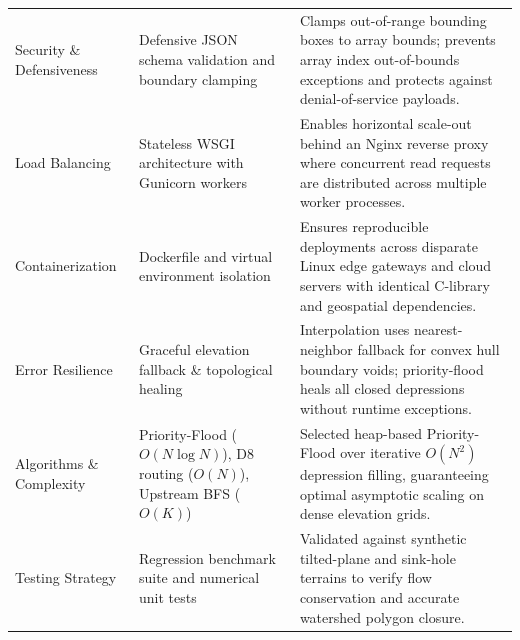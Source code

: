 \documentclass[manuscript,screen,review]{acmart}
\begin{document}
\begin{table}[htb]
\begin{tabular}{p{2.3cm}p{3.8cm}p{7.1cm}}
    Security \& Defensiveness & Defensive JSON schema validation and boundary clamping & Clamps out-of-range bounding boxes to array bounds; prevents array index out-of-bounds exceptions and protects against denial-of-service payloads. \\
    Load Balancing & Stateless WSGI architecture with Gunicorn workers & Enables horizontal scale-out behind an Nginx reverse proxy where concurrent read requests are distributed across multiple worker processes. \\
    Containerization & Dockerfile and virtual environment isolation & Ensures reproducible deployments across disparate Linux edge gateways and cloud servers with identical C-library and geospatial dependencies. \\
    Error Resilience & Graceful elevation fallback \& topological healing & Interpolation uses nearest-neighbor fallback for convex hull boundary voids; priority-flood heals all closed depressions without runtime exceptions. \\
    Algorithms \& Complexity & Priority-Flood ($O(N \log N)$), D8 routing ($O(N)$), Upstream BFS ($O(K)$) & Selected heap-based Priority-Flood over iterative $O(N^2)$ depression filling, guaranteeing optimal asymptotic scaling on dense elevation grids. \\
    Testing Strategy & Regression benchmark suite and numerical unit tests & Validated against synthetic tilted-plane and sink-hole terrains to verify flow conservation and accurate watershed polygon closure. \\
    \bottomrule
  \end{tabular}
\end{table}
\end{document}
